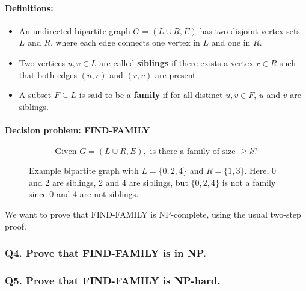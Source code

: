 \documentclass[9pt]{extarticle}
\begin{document}
\paragraph{Definitions:}
\begin{itemize}
    \item An undirected bipartite graph $G = (L \cup R, E)$ has two disjoint vertex sets $L$ and $R$, where each edge connects one vertex in $L$ and one in $R$.
    \item Two vertices $u, v \in L$ are called \textbf{siblings} if there exists a vertex $r \in R$ such that both edges $(u, r)$ and $(r, v)$ are present.
    \item A subset $F \subseteq L$ is said to be a \textbf{family} if for all distinct $u, v \in F$, $u$ and $v$ are siblings.
\end{itemize}

\paragraph{Decision problem: FIND-FAMILY}
\[
\text{Given } G = (L \cup R, E), \text{ is there a family of size } \geq k?
\]

\begin{figure}[h]
    \centering
    \caption{Example bipartite graph with $L = \{0, 2, 4\}$ and $R = \{1, 3\}$.  
    Here, 0 and 2 are siblings, 2 and 4 are siblings, but $\{0, 2, 4\}$ is not a family since 0 and 4 are not siblings.}
\end{figure}

We want to prove that FIND-FAMILY is NP-complete, using the usual two-step proof.

\subsubsection*{Q4. Prove that FIND-FAMILY is in NP.}

\subsubsection*{Q5. Prove that FIND-FAMILY is NP-hard.}
\end{document}
